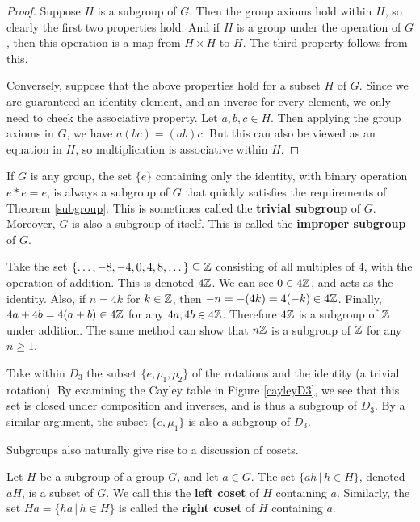 \begin{proof}
Suppose $H$ is a subgroup of $G$. Then the group axioms hold within $H$, so clearly the first two properties hold. And if $H$ is a group under the operation of $G$, then this operation is a map from $H \times H$ to $H$. The third property follows from this.

Conversely, suppose that the above properties hold for a subset $H$ of $G$. Since we are guaranteed an identity element, and an inverse for every element, we only need to check the associative property. Let $a, b, c \in H$. Then applying the group axioms in $G$, we have $a(bc) = (ab)c$. But this can also be viewed as an equation in $H$, so multiplication is associative within $H$.

\end{proof}

\begin{example}
If $G$ is any group, the set $\{e\}$ containing only the identity, with binary operation $e*e = e$, is always a subgroup of $G$ that quickly satisfies the requirements of Theorem \ref{subgroup}. This is sometimes called the \textbf{trivial subgroup} of $G$. Moreover, $G$ is also a subgroup of itself. This is called the \textbf{improper subgroup} of $G$.
\end{example}

\begin{example}
\label{4z}
Take the set $\{\dots, -8, -4, 0, 4, 8, \dots\} \subseteq \mathbb{Z}$ consisting of all multiples of $4$, with the operation of addition. This is denoted $4\mathbb{Z}$. We can see $0 \in 4\mathbb{Z}$, and acts as the identity. Also, if $n = 4k$ for $k \in \mathbb{Z}$, then $-n = -(4k) = 4(-k) \in 4\mathbb{Z}$. Finally, $4a + 4b = 4(a+b) \in 4\mathbb{Z}$ for any $4a, 4b \in 4\mathbb{Z}$. Therefore $4\mathbb{Z}$ is a subgroup of $\mathbb{Z}$ under addition. The same method can show that $n\mathbb{Z}$ is a subgroup of $\mathbb{Z}$ for any $n \geq 1$.
\end{example}

\begin{example}
Take within $D_3$ the subset $\{e, \rho_1, \rho_2\}$ of the rotations and the identity (a trivial rotation). By examining the Cayley table in Figure \ref{cayleyD3}, we see that this set is closed under composition and inverses, and is thus a subgroup of $D_3$. By a similar argument, the subset $\{e, \mu_1\}$ is also a subgroup of $D_3$.
\end{example}

Subgroups also naturally give rise to a discussion of cosets.

\begin{definition}
Let $H$ be a subgroup of a group $G$, and let $a \in G$. The set $\{ah \,|\, h \in H\}$, denoted $aH$, is a subset of $G$. We call this the \textbf{left coset} of $H$ containing $a$. Similarly, the set $Ha = \{ha \,|\, h \in H\}$ is called the \textbf{right coset} of $H$ containing $a$.
\end{definition}

